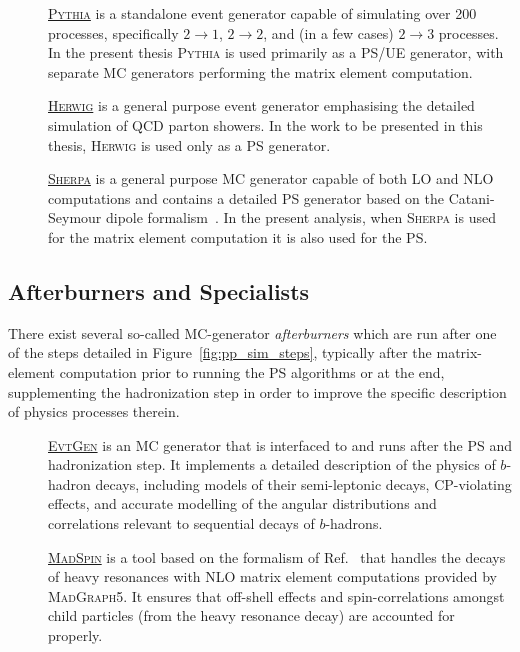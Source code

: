 \begin{description}
    \item[] \underline{\textsc{Pythia}} \cite{PYTHIA8Intro,PYTHIA8} is a standalone event generator
        capable of simulating over 200 processes, specifically $2\rightarrow 1$, $2 \rightarrow 2$, and
        (in a few cases) $2\rightarrow3$ processes.
        In the present thesis \textsc{Pythia} is used primarily as a PS/UE generator, with separate MC generators
        performing the matrix element computation.
    \item[] \underline{\textsc{Herwig}} \cite{HERWIG6,HERWIG7} is a general purpose event generator emphasising
        the detailed simulation of QCD parton showers. In the work to be presented in this thesis,
        \textsc{Herwig} is used only as a PS generator.
    \item[] \underline{\textsc{Sherpa}} \cite{SHERPA1,SHERPA2} is a general purpose MC generator capable
        of both LO and NLO computations and contains a detailed PS generator based on the
        Catani-Seymour dipole formalism~\cite{Schumann:2007mg}.
        In the present analysis, when \textsc{Sherpa} is used for the matrix element computation it is
        also used for the PS.
\end{description}

\subsection{Afterburners and Specialists}
\label{sec:mc_gen_afterburner}

There exist several so-called MC-generator \textit{afterburners} which are run
after one of the steps detailed in Figure~\ref{fig:pp_sim_steps}, typically after the matrix-element
computation prior to running the PS algorithms or at the end, supplementing the hadronization step in order
to improve the specific description of physics processes therein.

\begin{description}
    \item[] \underline{\textsc{EvtGen}} \cite{EVTGEN} is an MC generator that is interfaced to and runs after
        the PS and hadronization step. It implements a detailed description of the physics of $b$-hadron
        decays, including models of their semi-leptonic decays, CP-violating effects, and accurate
        modelling of the angular distributions and correlations relevant to sequential decays of $b$-hadrons.
    \item[] \underline{\textsc{MadSpin}} \cite{MADSPIN1} is a tool based on the formalism of Ref.~\cite{MADSPIN2}
        that handles the decays of heavy resonances with NLO matrix element computations provided by \textsc{MadGraph5}.
        It ensures that
        off-shell effects and spin-correlations amongst child particles (from the heavy resonance decay) are accounted for properly.
\end{description}

